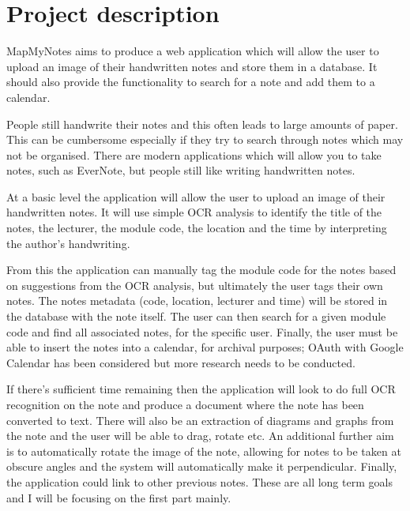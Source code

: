 \documentclass[11pt,fleqn,twoside]{article}
\begin{document}
\wordcount{}

\mmp

\setcounter{tocdepth}{3} %


\section{Project description}
MapMyNotes aims to produce a web application which will allow the user to upload an image of their handwritten notes and store them in a database. It should also provide the functionality to search for a note and add them to a calendar.

People still handwrite their notes and this often leads to large amounts of paper. This can be cumbersome especially if they try to search through notes which may not be organised. There are modern applications which will allow you to take notes, such as EverNote, but people still like writing handwritten notes.

At a basic level the application will allow the user to upload an image of their handwritten notes. It will use simple OCR analysis to identify the title of the notes, the lecturer, the module code, the location and the time by interpreting the author's handwriting.

From this the application can manually tag the module code for the notes based on suggestions from the OCR analysis, but ultimately the user tags their own notes. The notes metadata (code, location, lecturer and time) will be stored in the database with the note itself. The user can then search for a given module code and find all associated notes, for the specific user. Finally, the user must be able to insert the notes into a calendar, for archival purposes; OAuth with Google Calendar has been considered but more research needs to be conducted.

If there's sufficient time remaining then the application will look to do full OCR recognition on the note and produce a document where the note has been converted to text. There will also be an extraction of diagrams and graphs from the note and the user will be able to drag, rotate etc. An additional further aim is to automatically rotate the image of the note, allowing for notes to be taken at obscure angles and the system will automatically make it perpendicular. Finally, the application could link to other previous notes. These are all long term goals and I will be focusing on the first part mainly.
\end{document}
